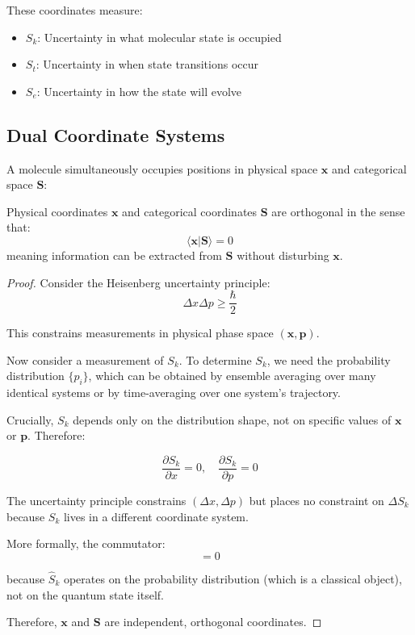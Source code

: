 These coordinates measure:
\begin{itemize}
\item $S_k$: Uncertainty in what molecular state is occupied
\item $S_t$: Uncertainty in when state transitions occur
\item $S_e$: Uncertainty in how the state will evolve
\end{itemize}

\subsection{Dual Coordinate Systems}

A molecule simultaneously occupies positions in physical space $\mathbf{x}$ and categorical space $\mathbf{S}$:

\begin{theorem}
Physical coordinates $\mathbf{x}$ and categorical coordinates $\mathbf{S}$ are orthogonal in the sense that:
\begin{equation}
\langle \mathbf{x} | \mathbf{S} \rangle = 0
\end{equation}
meaning information can be extracted from $\mathbf{S}$ without disturbing $\mathbf{x}$.
\end{theorem}

\begin{proof}
Consider the Heisenberg uncertainty principle:
\begin{equation}
\Delta x \Delta p \geq \frac{\hbar}{2}
\end{equation}

This constrains measurements in physical phase space $(\mathbf{x}, \mathbf{p})$.

Now consider a measurement of $S_k$. To determine $S_k$, we need the probability distribution $\{p_i\}$, which can be obtained by ensemble averaging over many identical systems or by time-averaging over one system's trajectory.

Crucially, $S_k$ depends only on the distribution shape, not on specific values of $\mathbf{x}$ or $\mathbf{p}$. Therefore:

\begin{equation}
\frac{\partial S_k}{\partial x} = 0, \quad \frac{\partial S_k}{\partial p} = 0
\end{equation}

The uncertainty principle constrains $(\Delta x, \Delta p)$ but places no constraint on $\Delta S_k$ because $S_k$ lives in a different coordinate system.

More formally, the commutator:
\begin{equation}
[\hat{x}, \hat{S}_k] = 0
\end{equation}

because $\hat{S}_k$ operates on the probability distribution (which is a classical object), not on the quantum state itself.

Therefore, $\mathbf{x}$ and $\mathbf{S}$ are independent, orthogonal coordinates.
\end{proof}

